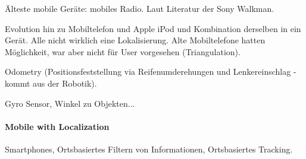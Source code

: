 Älteste mobile Geräte: mobiles Radio. Laut Literatur der Sony Walkman.

Evolution hin zu Mobiltelefon und Apple iPod und Kombination derselben in ein Gerät.
Alle nicht wirklich eine Lokalisierung. Alte Mobiltelefone hatten Möglichkeit, war 
aber nicht für User vorgesehen (Triangulation). 

Odometry (Positionsfeststellung via Reifenumderehungen und Lenkereinschlag - kommt aus der
Robotik). 

Gyro Sensor, Winkel zu Objekten...

\paragraph{Mobile with Localization}

Smartphones, Ortsbasiertes Filtern von Informationen, Ortsbasiertes Tracking.




